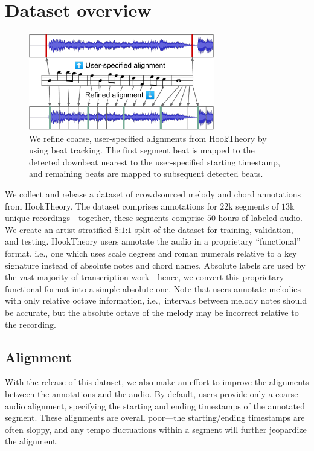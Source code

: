 \documentclass{article}
\newcommand{\hooktheory}{HookTheory}
\begin{document}
\section{Dataset overview}

\begin{figure}
    \centering
    \includegraphics[width=8.1cm]{figs/alignment.pdf}
    \caption{We refine coarse, user-specified alignments from \hooktheory{} by using beat tracking. The first segment beat is mapped to the detected downbeat nearest to the user-specified starting timestamp, and remaining beats are mapped to subsequent detected beats.}
 \label{fig:alignment}
\end{figure}

We collect and release a dataset of crowdsourced melody and chord annotations from \hooktheory{}. 
The dataset comprises annotations for $22$k segments of $13$k unique recordings---together, these segments comprise $50$ hours of labeled audio. 
We create an artist-stratified $8$:$1$:$1$ split of the dataset for training, validation, and testing. 
\hooktheory{} users annotate the audio in a proprietary ``functional'' format, i.e., one which uses scale degrees and roman numerals relative to a key signature instead of absolute notes and chord names. 
Absolute labels are used by the vast majority of transcription work---hence, we convert this proprietary functional format into a simple absolute one. 
Note that users annotate melodies with only relative octave information, i.e.,~intervals between melody notes should be accurate, but the absolute octave of the melody may be incorrect relative to the recording.

\subsection{Alignment}

With the release of this dataset, we also make an effort to improve the alignments between the annotations and the audio. 
By default, users provide only a coarse audio alignment, specifying the starting and ending timestamps of the annotated segment. 
These alignments are overall poor---the starting/ending timestamps are often sloppy, and any tempo fluctuations within a segment will further jeopardize the alignment.
\end{document}
